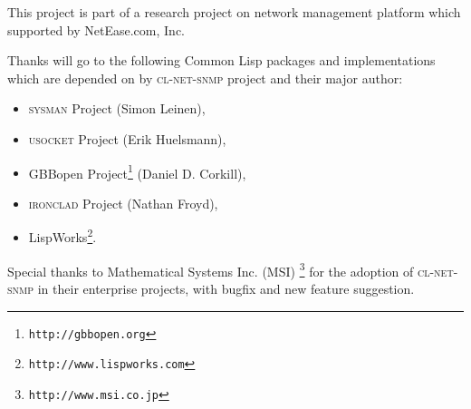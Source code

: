 \documentclass[reprint,natbib,9pt]{sigplanconf}
\begin{document}
\acks

This project is part of a research project on network management platform
which supported by NetEase.com, Inc.

Thanks will go to the following Common Lisp packages and
implementations which are depended on by \textsc{cl-net-snmp} project
and their major author:
%
\begin{itemize}
\item \textsc{sysman} Project (Simon Leinen),
\item \textsc{usocket} Project (Erik Huelsmann),
\item GBBopen Project\footnote{\texttt{http://gbbopen.org}} (Daniel D. Corkill),
\item \textsc{ironclad} Project (Nathan Froyd),
\item LispWorks\footnote{\texttt{http://www.lispworks.com}}.
\end{itemize}

Special thanks to Mathematical Systems Inc. (MSI) \footnote{
\texttt{http://www.msi.co.jp}} for the adoption of
\textsc{cl-net-snmp} in their enterprise projects,
with bugfix and new feature suggestion.


\end{document}
